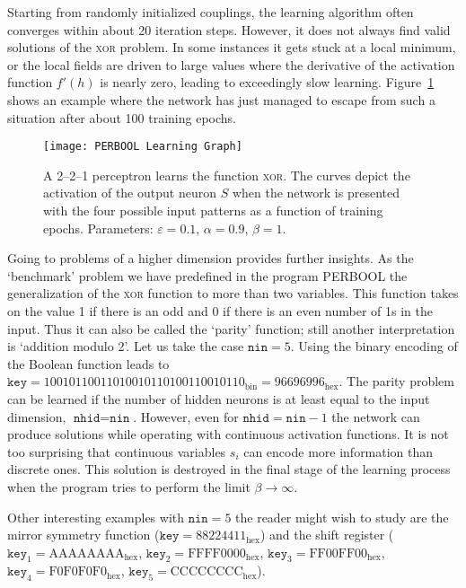 Starting from randomly initialized couplings, the learning algorithm often converges within about 20 iteration steps. However, it does not always find valid solutions of the \textsc{xor} problem. In some instances it gets stuck at a local minimum, or the local fields are driven to large values where the derivative of the activation function $f'(h)$ is nearly zero, leading to exceedingly slow learning. Figure~\ref{PERBOOLLearningGraph} shows an example where the network has just managed to escape from such a situation after about 100 training epochs.
\begin{figure}[h!t]
\centering
\texttt{[image: PERBOOL Learning Graph]}
\caption{A 2--2--1 perceptron learns the function \textsc{xor}. The curves depict the activation of the output
neuron $S$ when the network is presented with the four possible input patterns as a function of training epochs. Parameters: $\varepsilon=0.1$, $\alpha=0.9$, $\beta=1$.}\label{PERBOOLLearningGraph}
\end{figure}

Going to problems of a higher dimension provides further insights. As the `benchmark' problem we have predefined in the program PERBOOL the generalization of the \textsc{xor} function to more than two variables. This function takes on the value 1 if there is an odd and 0 if there is an even number of 1s in the input. Thus it can also be called the `parity' function; still another interpretation is `addition modulo 2'. Let us take the case $\texttt{nin}=5$. Using the binary encoding of the Boolean function leads to $\texttt{key}={10010110011010010110100110010110}_{\text{bin}}={96696996}_{\text{hex}}$. The parity problem can be learned if the number of hidden neurons is at least equal to the input dimension, $\texttt{nhid}=\texttt{nin}$. However, even for $\texttt{nhid}=\texttt{nin}-1$ the network can produce solutions while operating with continuous activation functions. It is not too surprising that continuous variables $s_i$ can encode more information than discrete ones. This solution is destroyed in the final stage of the learning process when the program tries to perform the limit $\beta\rightarrow\infty$.

Other interesting examples with $\texttt{nin}=5$ the reader might wish to study are the mirror symmetry function ($\texttt{key}={88224411}_{\text{hex}}$) and the shift register ($\texttt{key}_1=\text{AAAAAAAA}_{\text{hex}}$, $\texttt{key}_2=\text{FFFF0000}_{\text{hex}}$, $\texttt{key}_3=\text{FF00FF00}_{\text{hex}}$, $\texttt{key}_4=\text{F0F0F0F0}_{\text{hex}}$, $\texttt{key}_5=\text{CCCCCCCC}_{\text{hex}}$).

